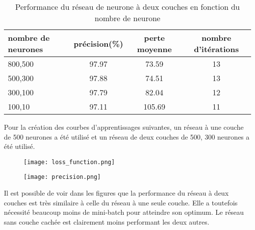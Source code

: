 \documentclass[a4paper, 12pt]{article} %
\begin{document}
\begin{table}[H]
\centering
\caption{Performance du réseau de neurone à deux couches en fonction du nombre de neurone}
\begin{tabular}{|l|c|c|c|}
	\hline
	nombre de neurones & précision(\%) & perte moyenne & nombre d'itérations\\
	\hline
	800,500	&	97.97	& 73.59  & 13\\
	\hline
	500,300	&	97.88	& 74.51  & 13\\
	\hline
	300,100	&	97.79	& 82.04  & 12\\
	\hline
	100,10	&	97.11	& 105.69 & 11\\
	\hline
\end{tabular}
\end{table}


Pour la création des courbes d'apprentissages suivantes, un réseau à une couche de 500 neurones a été utilisé et un réseau de deux couches de 500, 300 neurones a été utilisé.

\begin{figure}[H]
    \label{lossfunction}
    \texttt{[image: loss\_function.png]}
\end{figure}
\begin{figure}[H]
    \label{precision}
    \texttt{[image: precision.png]}
\end{figure}

Il est possible de voir dans les figures que la performance du réseau à deux couches est très similaire à celle du réseau à une seule couche. Elle a toutefois nécessité beaucoup moins de mini-batch pour atteindre son optimum. Le réseau sans couche cachée est clairement moins performant les deux autres. 
\end{document}
